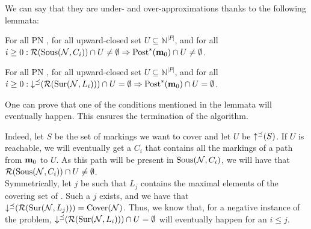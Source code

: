 We can say that they are under- and over-approximations thanks to the following lemmata:
\begin{lemm}
  For all \ac{PN} \NPTm, for all upward-closed set $U \subseteq \mathbb{N}^{|P|}$, and for all $i \geq 0: \operatorname{\mathcal{R}}(\operatorname{Sous}(\mathcal{N},C_i)) \cap U \neq \emptyset \Rightarrow \operatorname{Post}^*(\mathbf{m}_0) \cap U \neq \emptyset$.
\end{lemm}
\begin{lemm}
  For all \ac{PN} \NPTm, for all upward-closed set $U \subseteq \mathbb{N}^{|P|}$, and for all $i \geq 0: \operatorname{\downarrow^\preceq}(\operatorname{\mathcal{R}}(\operatorname{Sur}(\mathcal{N},L_i))) \cap U = \emptyset \Rightarrow \operatorname{Post}^*(\mathbf{m}_0) \cap U = \emptyset$.
\end{lemm}

One can prove that one of the conditions mentioned in the lemmata will eventually happen.
This ensures the termination of the algorithm.

Indeed, let $S$ be the set of markings we want to cover and let $U$ be $\operatorname{\uparrow^\preceq}(S)$.
If $U$ is reachable, we will eventually get a $C_i$ that contains all the markings of a path from $\mathbf{m}_0$ to $U$.
As this path will be present in $\operatorname{Sous}(\mathcal{N}, C_i)$, we will have that $\operatorname{\mathcal{R}}(\operatorname{Sous}(\mathcal{N},C_i)) \cap U \neq \emptyset$.\\
Symmetrically, let $j$ be such that $L_j$ contains the maximal elements of the covering set of \N.
Such a $j$ exists, and we have that $\operatorname{\downarrow^\preceq}(\operatorname{\mathcal{R}}(\operatorname{Sur}(\mathcal{N},L_j))) = \operatorname{Cover}(\mathcal{N})$.
Thus, we know that, for a negative instance of the problem, $\operatorname{\downarrow^\preceq}(\operatorname{\mathcal{R}}(\operatorname{Sur}(\mathcal{N},L_i))) \cap U = \emptyset$ will eventually happen for an $i \leq j$.


